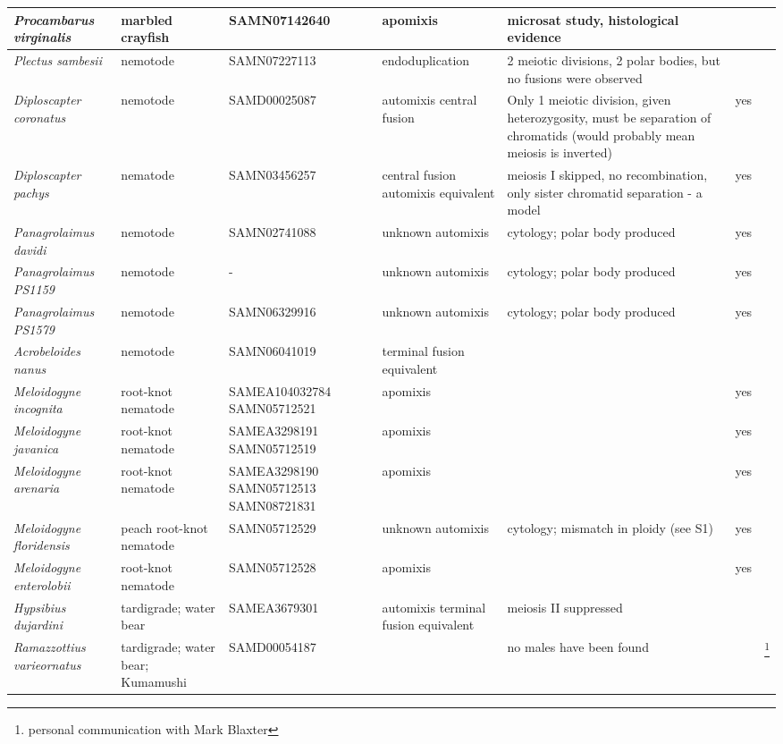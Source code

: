 \documentclass{article}
\begin{document}
\begin{longtable}[H]{ C{.13\textwidth} C{.1\textwidth} C{.12\textwidth} L{.2\textwidth} L{.15\textwidth} C{.1\textwidth} C{.07\textwidth}}
      \textit{Procambarus virginalis} & marbled crayfish & SAMN07142640 & apomixis & microsat study, histological evidence &  & \cite{Vogt2004,Martin2015} \\
      \hline
      \textit{Plectus sambesii} & nemotode & SAMN07227113 & endoduplication & 2 meiotic divisions, 2 polar bodies, but no fusions were observed &  & \cite{Lahl2006} \\
      \textit{Diploscapter coronatus} & nemotode & SAMD00025087 & automixis central fusion & Only 1 meiotic division, given heterozygosity, must be separation of chromatids (would probably mean meiosis is inverted) & yes & \cite{Lahl2006,Hiraki2017} \\
      \textit{Diploscapter pachys} & nematode & SAMN03456257 & central fusion automixis equivalent & meiosis I skipped, no recombination, only sister chromatid separation - a model & yes & \cite{Fradin2017} \\
      \textit{Panagrolaimus davidi} & nemotode & SAMN02741088 & unknown automixis & cytology; polar body produced & yes & \cite{Schiffer2017} \\
      \textit{Panagrolaimus PS1159} & nemotode & - & unknown automixis & cytology; polar body produced & yes & \cite{Schiffer2017} \\
      \textit{Panagrolaimus PS1579} & nemotode & SAMN06329916 & unknown automixis & cytology; polar body produced & yes & \cite{Schiffer2017} \\
      \textit{Acrobeloides nanus} & nemotode & SAMN06041019 & terminal fusion equivalent & &  & \cite{Lahl2006} \\
      \textit{Meloidogyne incognita} & root-knot nematode & SAMEA104032784 SAMN05712521 & apomixis & & yes & \cite{Triantaphyllou1981, VanderBeek1998} \\
      \textit{Meloidogyne javanica} & root-knot nematode & SAMEA3298191 SAMN05712519 & apomixis & & yes & \\
      \textit{Meloidogyne arenaria} & root-knot nematode & SAMEA3298190 SAMN05712513 SAMN08721831 & apomixis & & yes & \\
      \textit{Meloidogyne floridensis} & peach root-knot nematode & SAMN05712529 & unknown automixis & cytology; mismatch in ploidy (see S1) & yes & \cite{Handoo2004} \\
      \textit{Meloidogyne enterolobii} & root-knot nematode & SAMN05712528 & apomixis & & yes \\
      \hline
      \textit{Hypsibius dujardini} & tardigrade; water bear & SAMEA3679301 & automixis terminal fusion equivalent & meiosis II suppressed &  & \cite{Ammermann1967} \\
      \textit{Ramazzottius varieornatus} & tardigrade; water bear; Kumamushi & SAMD00054187 & & no males have been found &  & \footnote{personal communication with Mark Blaxter} \\

    \end{longtable}

  \clearpage
  \newpage

  
  {}
\end{document}
